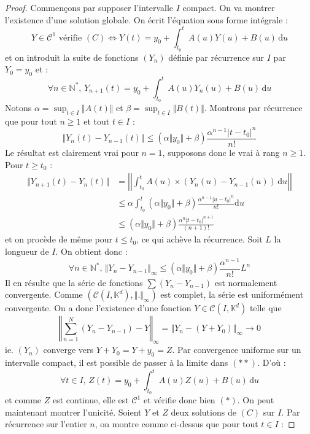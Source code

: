   \begin{proof}
    Commençons par supposer l'intervalle $I$ compact. On va montrer l'existence d'une solution globale. On écrit l'équation sous forme intégrale :
    \[ Y \in \mathcal{C}^1 \text{ vérifie } (C) \iff Y(t) = y_0 + \int_{t_0}^t A(u) Y(u) + B(u) \, \mathrm{d}u \tag{$*$} \]
    et on introduit la suite de fonctions $(Y_n)$ définie par récurrence sur $I$ par $Y_0 = y_0$ et :
    \[ \forall n \in \mathbb{N}^*, \, Y_{n+1}(t) = y_0 + \int_{t_0}^t A(u) Y_n(u) + B(u) \, \mathrm{d}u \tag{$**$} \]
    Notons $\alpha = \sup_{t \in I} \Vert A(t) \Vert$ et $\beta = \sup_{t \in I} \Vert B(t) \Vert$. Montrons par récurrence que pour tout $n \geq 1$ et tout $t \in I$ :
    \[ \Vert Y_n(t) - Y_{n-1}(t) \Vert \leq (\alpha \Vert y_0 \Vert + \beta) \frac{\alpha^{n-1} |t-t_0|^n}{n!} \]
    Le résultat est clairement vrai pour $n = 1$, supposons donc le vrai à rang $n \geq 1$. Pour $t \geq t_0$ :
    \begin{align*}
      \Vert Y_{n+1}(t) - Y_n(t) \Vert &= \left| \left| \int_{t_0}^t A(u) \times (Y_n(u) - Y_{n-1}(u)) \, \mathrm{d}u \right| \right| \\
      &\leq \alpha \int_{t_0}^t (\alpha \Vert y_0 \Vert + \beta) \frac{\alpha^{n-1} |u-t_0|^n}{n!} \mathrm{d}u \\
      &\leq (\alpha \Vert y_0 \Vert + \beta) \frac{\alpha^n |t-t_0|^{n+1}}{(n+1)!}
    \end{align*}
    et on procède de même pour $t \leq t_0$, ce qui achève la récurrence.
    \newpar
    Soit $L$ la longueur de $I$. On obtient donc :
    \[ \forall n \in \mathbb{N}^*, \, \Vert Y_n - Y_{n-1} \Vert_{\infty} \leq (\alpha \Vert y_0 \Vert + \beta) \frac{\alpha^{n-1}}{n!} L^n \]
    Il en résulte que la série de fonctions $\sum (Y_n - Y_{n-1})$ est normalement convergente. Comme $(\mathcal{C} (I, \mathbb{K}^d), \Vert . \Vert_{\infty})$ est complet, la série est uniformément convergente. On a donc l'existence d'une fonction $Y \in \mathcal{C} (I, \mathbb{K}^d)$ telle que
    \[ \left \Vert \sum_{n=1}^N (Y_n - Y_{n-1}) - Y \right \Vert_\infty = \left \Vert Y_n - (Y + Y_0) \right \Vert_\infty \longrightarrow 0 \]
    ie. $(Y_n)$ converge vers $Y + Y_0 = Y + y_0 = Z$. Par convergence uniforme sur un intervalle compact, il est possible de passer à la limite dans $(**)$. D'où :
    \[ \forall t \in I, \, Z(t) = y_0 + \int_{t_0}^t A(u) Z(u) + B(u) \, \mathrm{d}u \]
    et comme $Z$ est continue, elle est $\mathcal{C}^1$ et vérifie donc bien $(*)$.
    \newpar
    On peut maintenant montrer l'unicité. Soient $Y$ et $Z$ deux solutions de $(C)$ sur $I$. Par récurrence sur l'entier $n$, on montre comme ci-dessus que pour tout $t \in I$ :

\end{proof}
